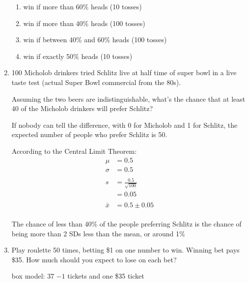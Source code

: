 \documentclass[letterpaper,landscape]{exam}
\begin{document}
\begin{enumerate}
      \begin{enumerate}
        \item win if more than 60\% heads (10 tosses)
        \item win if more than 40\% heads (100 tosses)
        \item win if between 40\% and 60\% heads (100 tosses)
        \item win if exactly 50\% heads (10 tosses)
      \end{enumerate}

    \item 100 Micholob drinkers tried Schlitz live at half time of super bowl in
      a live taste test (actual Super Bowl commercial from the 80s). 
      
      Assuming the two beers are indistinguishable, what's the chance that at
      least 40 of the Micholob drinkers will prefer Schlitz?

      \begin{solution}
        If nobody can tell the difference, with 0 for Micholob and 1 for
        Schlitz, the expected number of people who prefer Schlitz is 50.

        According to the Central Limit Theorem:
        \begin{align*}
          \mu     & = 0.5 \\
          \sigma  & = 0.5 \\
          \\
          s & = \frac{0.5}{\sqrt{100}} \\
            & = 0.05 \\
          \\
          \bar{x} &= 0.5 \pm 0.05 \\
        \end{align*}

        The chance of less than 40\% of the people preferring Schlitz is the
        chance of being more than 2 SDs less than the mean, or around 1\%

      \end{solution}

    \item Play roulette 50 times, betting \$1 on one number to win. Winning
      bet pays \$35. How much should you expect to lose on each bet? 

      \begin{solution}
        box model: 37 $-1$ tickets and one \$35 ticket


\end{solution}
\end{enumerate}
\end{document}
